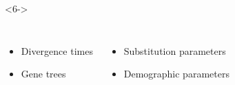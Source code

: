 \begin{frame}[t,label=fullmodel]
\begin{minipage}[t][0.45\textheight][t]{\linewidth}
\begin{onlyenv}
\begin{displaybox}[0.60\linewidth]
            \end{displaybox}
        \end{onlyenv}

        \vspace{-1.5mm}
        \begin{onlyenv}<6->
            \begin{columns}


                \begin{itemize}
                    \small
                    \item Divergence times
                    \item Gene trees
                \end{itemize}


                \begin{itemize}
                    \small
                    \item Substitution parameters
                    \item Demographic parameters
                \end{itemize}
            \end{columns}
        \end{onlyenv}
        

\end{minipage}
\end{frame}
